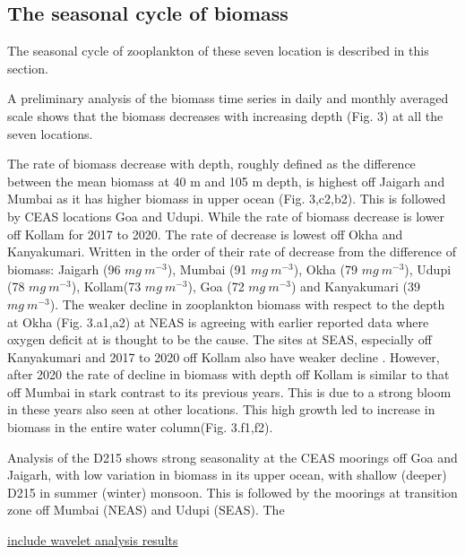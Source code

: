 \documentclass{article}
\begin{document}
	 	
	 
	 
	\subsection{The seasonal cycle of biomass}
	The seasonal cycle of zooplankton of these seven location is described in this section.
	   
	A preliminary analysis of the biomass time series in daily and monthly averaged scale shows that the biomass decreases with increasing depth (Fig. 3) at all the seven locations. 
	  
	The rate of biomass decrease with depth, roughly defined as the difference between the mean biomass at 40 m  and 105 m depth, is highest off Jaigarh and Mumbai as it has higher biomass in upper ocean (Fig. 3,c2,b2). This is followed by CEAS locations Goa and Udupi. While the rate of biomass decrease is lower off Kollam for 2017 to 2020. The rate of decrease is lowest off Okha and Kanyakumari. Written in the order of their rate of decrease from the difference of biomass: Jaigarh (96 $mg\ m^{-3}$), Mumbai (91 $mg\ m^{-3}$), Okha (79 $mg\ m^{-3}$), Udupi (78 $mg\ m^{-3}$), Kollam(73 $mg\ m^{-3}$), Goa (72 $mg\ m^{-3}$) and Kanyakumari (39 $mg\ m^{-3}$). The weaker decline in zooplankton biomass with respect to the depth at Okha (Fig. 3.a1,a2) at NEAS is agreeing with earlier reported data \cite{madhupratap2001mesozooplankton,smith2005mesozooplankton,wishner1998mesozooplankton} where oxygen deficit at is thought to be the cause. The sites at SEAS, especially off Kanyakumari and 2017 to 2020 off Kollam also have weaker decline \citep{madhupratap2001mesozooplankton, aparna2022seasonal}. However, after 2020 the rate of decline in biomass with depth off Kollam is similar to that off Mumbai in stark contrast to its previous years. This is due to a strong bloom in these years also seen at other locations. This high growth led to increase in biomass in the entire water column(Fig. 3.f1,f2).
	 
	Analysis of the D215 shows strong seasonality at the CEAS moorings off Goa and Jaigarh, with low variation in biomass in its upper ocean, with shallow (deeper) D215 in summer (winter) monsoon. This is followed by the moorings at transition zone off Mumbai (NEAS) and Udupi (SEAS). The 
	 
	{\underline{include wavelet analysis results}}

	\newpage	 

	\newpage
	
\end{document}
